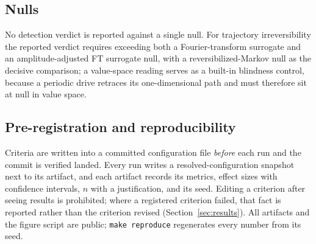 \subsection{Nulls}
No detection verdict is reported against a single null. For trajectory irreversibility the
reported verdict requires exceeding both a Fourier-transform surrogate and an
amplitude-adjusted FT surrogate null, with a reversibilized-Markov null as the decisive
comparison; a value-space reading serves as a built-in blindness control, because a periodic
drive retraces its one-dimensional path and must therefore sit at null in value space.

\subsection{Pre-registration and reproducibility}
Criteria are written into a committed configuration file \emph{before} each run and the
commit is verified landed. Every run writes a resolved-configuration snapshot next to its
artifact, and each artifact records its metrics, effect sizes with confidence intervals,
$n$ with a justification, and its seed. Editing a criterion after seeing results is
prohibited; where a registered criterion failed, that fact is reported rather than the
criterion revised (Section~\ref{sec:results}). All artifacts and the figure script are
public; \texttt{make reproduce} regenerates every number from its seed.
